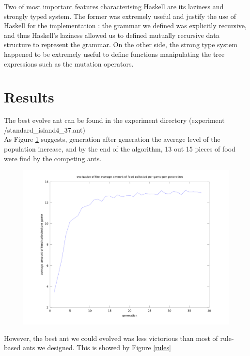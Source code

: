 \documentclass[10pt,a4paper]{article}
\begin{document}
Two of most important features characterising Haskell are its laziness
and strongly typed system. The former was extremely useful and justify
the use of Haskell for the implementation : the grammar we defined was
explicitly recursive, and thus Haskell's laziness allowed us to
defined mutually recursive data structure to represent the grammar. On
the other side, the strong type system happened to be extremely useful
to define functions manipulating the tree expressions such as the
mutation operators.

\section{Results}

The best evolve ant can be found in the experiment directory
(experiment \slash standard\_island4\_37.ant)\\

As Figure \ref{food} suggests, generation after generation the average
level of the population increase, and by the end of the algorithm, 13
out 15 pieces of food were find by the competing ants.\\

\begin{figure}
\begin{center}
\includegraphics[scale=0.3]{../experiment/standard_island4_food_stat.png}
\end{center}
\label{food}
\end{figure}

However, the best ant we could evolved was less victorious than most
of rule-based ants we designed. This is showed by Figure \ref{rules}
\end{document}
